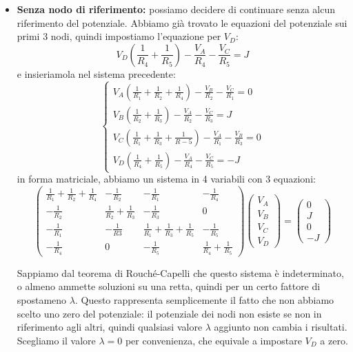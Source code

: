 \documentclass[a4paper,11pt]{article}
\begin{document}
\begin{itemize}
\item \textbf{Senza nodo di riferimento:} possiamo decidere di continuare senza alcun riferimento del potenziale.
	Abbiamo già trovato le equazioni del potenziale sui primi 3 nodi, quindi impostiamo l'equazione per $V_D$:
	$$ V_D \left( \frac{1}{R_4} + \frac{1}{R_5} \right) - \frac{V_A}{R_4} - \frac{V_C}{R_5} = J $$
	e insieriamola nel sistema precedente:
	\[
		\begin{cases}
		 V_A\left( \frac{1}{R_1} + \frac{1}{R_2} + \frac{1}{R_4} \right) - \frac{V_B}{R_2} - \frac{V_C}{R_1} = 0 \\ 
		 V_B \left( \frac{1}{R_2} + \frac{1}{R_3} \right) - \frac{V_A}{R_2} - \frac{V_C}{R_3} = J \\
		 V_C \left( \frac{1}{R_1} + \frac{1}{R_3} + \frac{1}{R-5} \right) - \frac{V_A}{R_1} - \frac{V_B}{R_3} = 0 \\
			V_D \left( \frac{1}{R_4} + \frac{1}{R_5} \right) - \frac{V_A}{R_4} - \frac{V_C}{R_5} = -J
		\end{cases}
	\]
	in forma matriciale, abbiamo un sistema in 4 variabili con 3 equazioni:
$$
\begin{pmatrix}
	\frac{1}{R_1} + \frac{1}{R_2} + \frac{1}{R_4} & -\frac{1}{R_2} & -\frac{1}{R_1} & -\frac{1}{R_4} \\
	-\frac{1}{R_2} & \frac{1}{R_2} + \frac{1}{R_3} & -\frac{1}{R_3} & 0 \\
	-\frac{1}{R_1} & -\frac{1}{R3} & \frac{1}{R_1} + \frac{1}{R_3} + \frac{1}{R_5} & -\frac{1}{R_5} \\
	-\frac{1}{R_4} & 0 & - \frac{1}{R_5} & \frac{1}{R_4} + \frac{1}{R_5}
\end{pmatrix}
\begin{pmatrix}
V_A \\ V_B \\ V_C \\ V_D
\end{pmatrix}
=
\begin{pmatrix}
0 \\ J \\ 0 \\ -J 
\end{pmatrix}
$$

Sappiamo dal teorema di Rouché-Capelli che questo sistema è indeterminato, o almeno ammette soluzioni su una retta, quindi per un certo fattore di spostameno $\lambda$.
Questo rappresenta semplicemente il fatto che non abbiamo scelto uno zero del potenziale: il potenziale dei nodi non esiste se non in riferimento agli altri, quindi qualsiasi valore $\lambda$ aggiunto non cambia i risultati.
Scegliamo il valore $\lambda = 0$ per convenienza, che equivale a impostare $V_D$ a zero.
\end{itemize}
\end{document}

